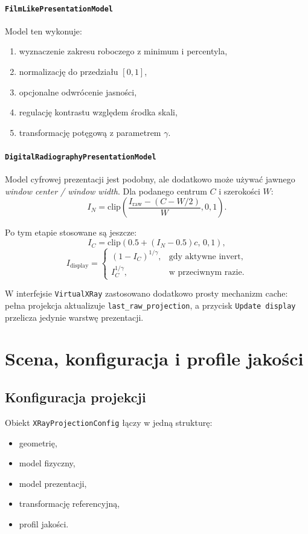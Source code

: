 \documentclass[12pt,a4paper]{article}
\begin{document}
\paragraph{\texttt{FilmLikePresentationModel}}
Model ten wykonuje:
\begin{enumerate}[label=\arabic*.]
  \item wyznaczenie zakresu roboczego z minimum i percentyla,
  \item normalizację do przedziału \([0,1]\),
  \item opcjonalne odwrócenie jasności,
  \item regulację kontrastu względem środka skali,
  \item transformację potęgową z parametrem \(\gamma\).
\end{enumerate}

\paragraph{\texttt{DigitalRadiographyPresentationModel}}
Model cyfrowej prezentacji jest podobny, ale dodatkowo może używać jawnego
\emph{window center / window width}. Dla podanego centrum \(C\) i szerokości \(W\):
\[
  I_N =
  \mathrm{clip}\!\left(
    \frac{I_{\mathrm{raw}} - (C - W/2)}{W},
    0,1
  \right).
\]

Po tym etapie stosowane są jeszcze:
\[
  I_C = \mathrm{clip}\!\left(0.5 + (I_N - 0.5)c,\, 0,1\right),
\]
\[
  I_{\mathrm{display}} =
  \begin{cases}
    (1 - I_C)^{1/\gamma}, & \text{gdy aktywne invert},\\[4pt]
    I_C^{1/\gamma}, & \text{w przeciwnym razie.}
  \end{cases}
\]

W interfejsie \texttt{VirtualXRay} zastosowano dodatkowo prosty mechanizm cache:
pełna projekcja aktualizuje \texttt{last\_raw\_projection}, a przycisk
\texttt{Update display} przelicza jedynie warstwę prezentacji.

\section{Scena, konfiguracja i profile jakości}

\subsection{Konfiguracja projekcji}

Obiekt \texttt{XRayProjectionConfig} łączy w jedną strukturę:
\begin{itemize}
  \item geometrię,
  \item model fizyczny,
  \item model prezentacji,
  \item transformację referencyjną,
  \item profil jakości.
\end{itemize}
\end{document}
